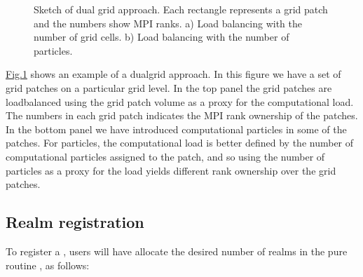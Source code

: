 \documentclass[letterpaper,10pt,english]{sphinxmanual}
\let\sphinxpxdimen\pdfpxdimen\else\newdimen\sphinxpxdimen
\begin{document}
\begin{figure}[htb]
\centering
\capstart

\noindent\sphinxincludegraphics[width=360\sphinxpxdimen]{{DualMesh}.png}
\caption{Sketch of dual grid approach.
Each rectangle represents a grid patch and the numbers show MPI ranks. a) Load balancing with the number of grid cells. b) Load balancing with the number of particles.}\label{\detokenize{Source/Realm:id1}}\label{\detokenize{Source/Realm:fig-dualmesh}}\end{figure}

\hyperref[\detokenize{Source/Realm:fig-dualmesh}]{Fig.\@ \ref{\detokenize{Source/Realm:fig-dualmesh}}} shows an example of a dual\sphinxhyphen{}grid approach.
In  this figure we have a set of grid patches on a particular grid level.
In the top panel the grid patches are load\sphinxhyphen{}balanced using the grid patch volume as a proxy for the computational load.
The numbers in each grid patch indicates the MPI rank ownership of the patches.
In the bottom panel we have introduced computational particles in some of the patches.
For particles, the computational load is better defined by the number of computational particles assigned to the patch, and so using the number of particles as a proxy for the load yields different rank ownership over the grid patches.


\subsection{Realm registration}
\label{\detokenize{Source/Realm:realm-registration}}
To register a , users will have  allocate the desired number of realms in the pure routine , as follows:

\begin{sphinxVerbatim}[commandchars=\\\{\},formatcom=\scriptsize]
 
\end{sphinxVerbatim}
\end{document}
